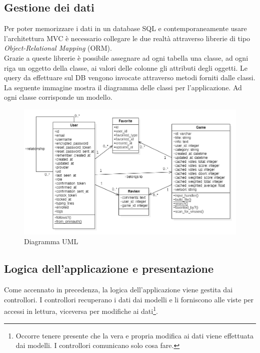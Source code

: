 \subsection{Gestione dei dati}
Per poter memorizzare i dati in un database SQL e contemporaneamente usare l'architettura MVC è necessario collegare le due realtà attraverso librerie di tipo \emph{Object-Relational Mapping} (ORM).\\

Grazie a queste librerie è possibile assegnare ad ogni tabella una classe, ad ogni riga un oggetto della classe, ai valori delle colonne gli attributi degli oggetti. Le query da effettuare sul DB vengono invocate attraverso metodi forniti dalle classi.\\

La seguente immagine mostra il diagramma delle classi per l'applicazione. Ad ogni classe corrisponde un modello.\\

\begin{figure}[hbt!]
    \centering
    \includegraphics[width=\textwidth]{UML.png}
    \caption{Diagramma UML}
\end{figure}

\FloatBarrier
\subsection{Logica dell'applicazione e presentazione}
Come accennato in precedenza, la logica dell'applicazione viene gestita dai controllori. I controllori recuperano i dati dai modelli e li forniscono alle viste per accessi in lettura, viceversa per modifiche ai dati\footnote{Occorre tenere presente che la vera e propria modifica ai dati viene effettuata dai modelli. I controllori comunicano solo cosa fare.}.\\


